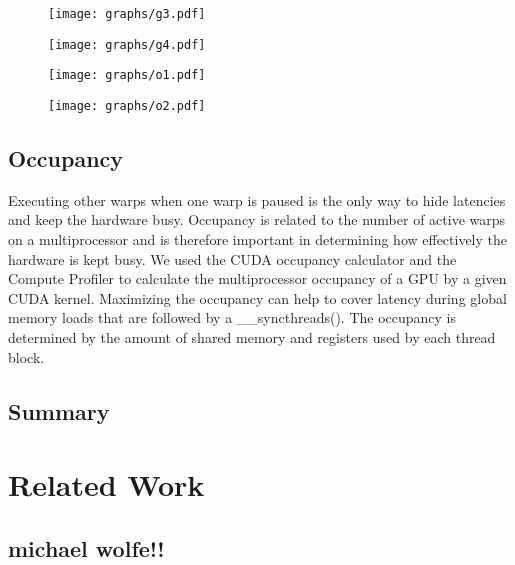 \documentclass[10pt]{article}
\begin{document}
\begin{multicols}{2}
    \begin{figure*}
        \centering
        \texttt{[image: graphs/g3.pdf]}
        \caption{}
        \label{fig:jacobi_mem_throughput}
    \end{figure*}

    \begin{figure*}
        \centering
        \texttt{[image: graphs/g4.pdf]}
        \caption{}
        \label{fig:reduction_mem_throughput}
    \end{figure*}

    \begin{figure*}
        \centering
        \texttt{[image: graphs/o1.pdf]}
        \caption{}
        \label{fig:1k_occupancy}
    \end{figure*}

    \begin{figure*}
        \centering
        \texttt{[image: graphs/o2.pdf]}
        \caption{}
        \label{fig:2k_occupancy}
    \end{figure*}

    \subsection{Occupancy}
    Executing other warps when one warp is paused is the only way to hide latencies and keep the hardware busy.
    Occupancy is related to the number of active warps on a multiprocessor and is therefore important in determining how effectively the hardware is kept busy.
    We used the CUDA occupancy calculator and the Compute Profiler  to calculate the multiprocessor occupancy of a GPU by a given CUDA kernel.
    Maximizing the occupancy can help to cover latency during global memory loads that are followed by a \_\_syncthreads().
    The occupancy is determined by the amount of shared memory and registers used by each thread block.

\subsection{Summary} %

\section{Related Work} %
    \subsection{michael wolfe!!}

\end{multicols}
\end{document}
